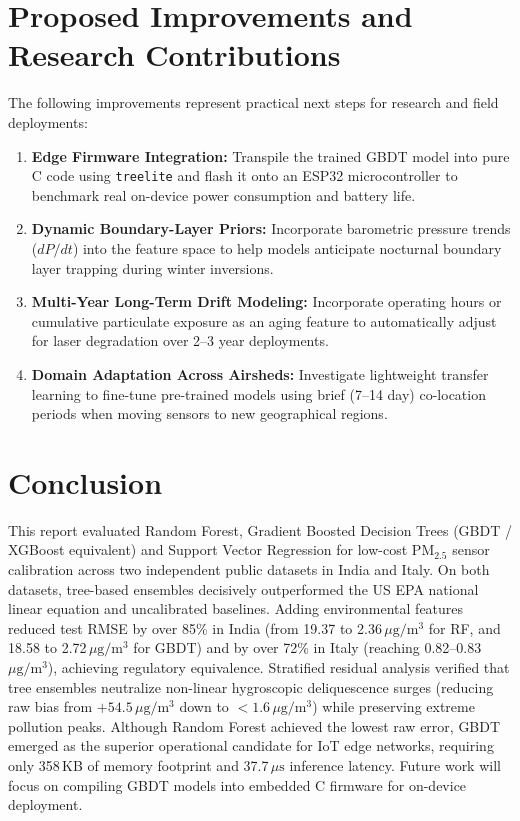 \documentclass[11pt,a4paper]{article}
\begin{document}
\section{Proposed Improvements and Research Contributions}
The following improvements represent practical next steps for research and field deployments:
\begin{enumerate}
    \item \textbf{Edge Firmware Integration:} Transpile the trained GBDT model into pure C code using \texttt{treelite} and flash it onto an ESP32 microcontroller to benchmark real on-device power consumption and battery life.
    \item \textbf{Dynamic Boundary-Layer Priors:} Incorporate barometric pressure trends ($dP/dt$) into the feature space to help models anticipate nocturnal boundary layer trapping during winter inversions.
    \item \textbf{Multi-Year Long-Term Drift Modeling:} Incorporate operating hours or cumulative particulate exposure as an aging feature to automatically adjust for laser degradation over 2--3 year deployments.
    \item \textbf{Domain Adaptation Across Airsheds:} Investigate lightweight transfer learning to fine-tune pre-trained models using brief (7--14 day) co-location periods when moving sensors to new geographical regions.
\end{enumerate}

\section{Conclusion}
This report evaluated Random Forest, Gradient Boosted Decision Trees (GBDT / XGBoost equivalent) and Support Vector Regression for low-cost $\text{PM}_{2.5}$ sensor calibration across two independent public datasets in India and Italy. On both datasets, tree-based ensembles decisively outperformed the US EPA national linear equation and uncalibrated baselines. Adding environmental features reduced test RMSE by over 85\% in India (from 19.37 to 2.36\,$\mu\text{g}/\text{m}^3$ for RF, and 18.58 to 2.72\,$\mu\text{g}/\text{m}^3$ for GBDT) and by over 72\% in Italy (reaching 0.82--0.83\,$\mu\text{g}/\text{m}^3$), achieving regulatory equivalence. Stratified residual analysis verified that tree ensembles neutralize non-linear hygroscopic deliquescence surges (reducing raw bias from $+54.5\,\mu\text{g}/\text{m}^3$ down to $< 1.6\,\mu\text{g}/\text{m}^3$) while preserving extreme pollution peaks. Although Random Forest achieved the lowest raw error, GBDT emerged as the superior operational candidate for IoT edge networks, requiring only 358\,KB of memory footprint and 37.7\,$\mu\text{s}$ inference latency. Future work will focus on compiling GBDT models into embedded C firmware for on-device deployment.
\end{document}
